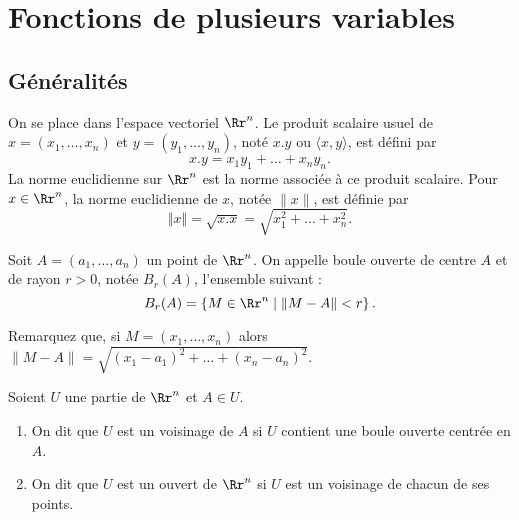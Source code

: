 \documentclass[class=report,crop=false]{standalone}
\begin{document}


\newcommand {\e}{{\rm e}}
\newcommand{\ja}{\mathrm{J}}
\newcommand{\jac}{\mathrm{Jac}}
\renewcommand{\d}{\,\mathrm{d}}
\newcommand {\Rrot}{{\rm rot}}
\newcommand{\aire}{{\rm Aire}}
\newcommand{\vol}{{\rm Vol}}





\tableofcontents




\chapter{Fonctions de plusieurs variables}
\section{Généralités}

\thispagestyle{empty}

\vskip4mm

\noindent On se place dans l'espace vectoriel $\Rr^n$. Le produit scalaire usuel de $x=(x_1,\dots ,x_n)$ et $y=(y_1,\dots ,y_n)$, noté $x.y$ ou $\langle x,y\rangle$, est défini par
$$x.y=x_1y_1+\dots +x_ny_n.$$
La norme euclidienne sur $\Rr^n$ est la norme associée à ce produit scalaire. Pour $x\in \Rr^n$, la norme euclidienne de $x$, notée $\| x\|$, est définie par
$$\Vert x\Vert =\sqrt{x.x}=\sqrt{x_1^2+\dots +x_n^2}.$$

\vskip4mm

\begin{definition}Soit $A=(a_1,\dots ,a_n)$ un point de $\Rr^n$. On appelle boule ouverte de centre $A$ et de rayon $r>0$, notée $B_r(A)$, l'ensemble suivant :
$$B_r(A)=\left\{M\in \Rr^n\mid \|M-A\|<r\right\}.$$
\end{definition}

\vskip4mm

\noindent Remarquez que, si $M=(x_1,\dots ,x_n)$ alors $\|M-A\|=\sqrt{(x_1-a_1)^2+\dots +(x_n-a_n)^2}$.

\vskip6mm

\begin{definition} Soient $U$ une partie de $\Rr^n$ et $A\in U$.
\begin{enumerate}
\item On dit que $U$ est un voisinage de $A$ si $U$ contient une boule ouverte centrée en $A$.
\item On dit que $U$ est un ouvert de $\Rr^n$ si $U$ est un voisinage de chacun de ses points.
\end{enumerate}
\end{definition}
\end{document}
